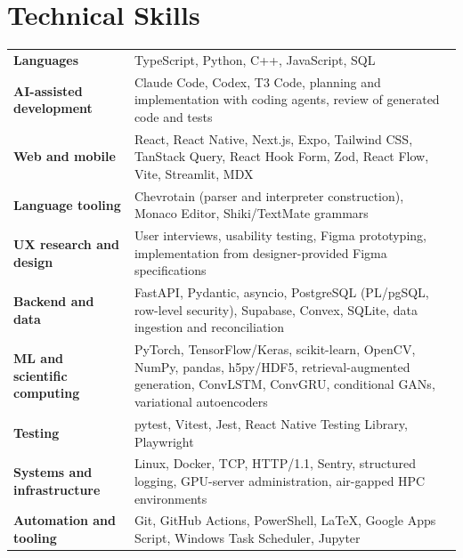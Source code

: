 \documentclass[letterpaper,10pt]{article}
\newcommand{\cvsection}[2]{%
  \needspace{\dimexpr#1\baselineskip+3\baselineskip\relax}%
  \section{#2}%
}
\newcommand{\skillrow}[2]{%
  \textbf{#1} & #2\\[3pt]
}
\begin{document}
\cvsection{9}{Technical Skills}
\begin{tabularx}{\linewidth}{@{}l X@{}}
  \skillrow
    {Languages}
    {TypeScript, Python, C++, JavaScript, SQL}

  \skillrow
    {AI-assisted development}
    {Claude Code, Codex, T3 Code, planning and implementation with coding agents, review of generated code and tests}

  \skillrow
    {Web and mobile}
    {React, React Native, Next.js, Expo, Tailwind CSS, TanStack Query, React Hook Form, Zod, React Flow, Vite, Streamlit, MDX}

  \skillrow
    {Language tooling}
    {Chevrotain (parser and interpreter construction), Monaco Editor, Shiki/TextMate grammars}

  \skillrow
    {UX research and design}
    {User interviews, usability testing, Figma prototyping, implementation from designer-provided Figma specifications}

  \skillrow
    {Backend and data}
    {FastAPI, Pydantic, asyncio, PostgreSQL (PL/pgSQL, row-level security), Supabase, Convex, SQLite, data ingestion and reconciliation}

  \skillrow
    {ML and scientific computing}
    {PyTorch, TensorFlow/Keras, scikit-learn, OpenCV, NumPy, pandas, h5py/HDF5, retrieval-augmented generation, ConvLSTM, ConvGRU, conditional GANs, variational autoencoders}

  \skillrow
    {Testing}
    {pytest, Vitest, Jest, React Native Testing Library, Playwright}

  \skillrow
    {Systems and infrastructure}
    {Linux, Docker, TCP, HTTP/1.1, Sentry, structured logging, GPU-server administration, air-gapped HPC environments}

  \skillrow
    {Automation and tooling}
    {Git, GitHub Actions, PowerShell, LaTeX, Google Apps Script, Windows Task Scheduler, Jupyter}
\end{tabularx}

\end{document}
